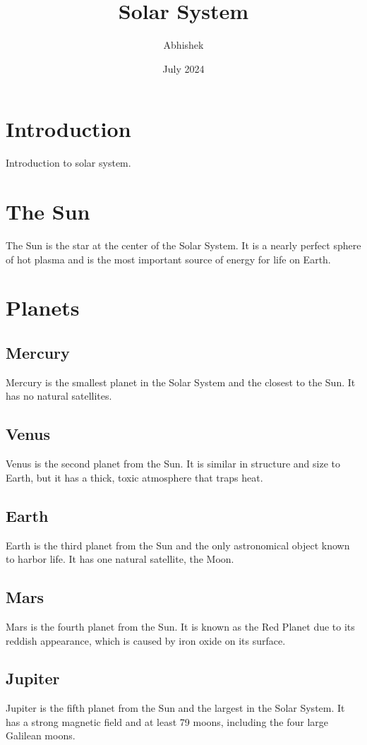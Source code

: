 \documentclass{article}
\title{Solar System}
\author{Abhishek }
\date{July 2024}
\begin{document}
\maketitle

\section{Introduction}
Introduction to solar system.
\section{The Sun}
The Sun is the star at the center of the Solar System. It is a nearly perfect sphere of hot plasma and is the most important source of energy for life on Earth.

\section{Planets}
\subsection{Mercury}
Mercury is the smallest planet in the Solar System and the closest to the Sun. It has no natural satellites.

\subsection{Venus}
Venus is the second planet from the Sun. It is similar in structure and size to Earth, but it has a thick, toxic atmosphere that traps heat.

\subsection{Earth}
Earth is the third planet from the Sun and the only astronomical object known to harbor life. It has one natural satellite, the Moon.

\subsection{Mars}
Mars is the fourth planet from the Sun. It is known as the Red Planet due to its reddish appearance, which is caused by iron oxide on its surface.

\subsection{Jupiter}
Jupiter is the fifth planet from the Sun and the largest in the Solar System. It has a strong magnetic field and at least 79 moons, including the four large Galilean moons.
\end{document}
